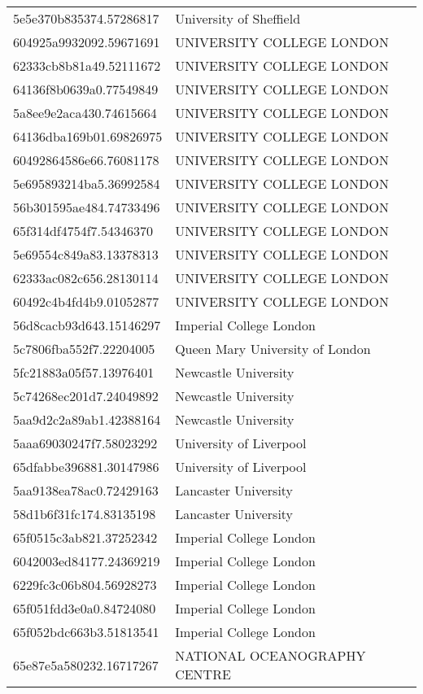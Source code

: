 \begin{tabular}{ll}
5e5e370b835374.57286817 & University of Sheffield \\
604925a9932092.59671691 & UNIVERSITY COLLEGE LONDON \\
62333cb8b81a49.52111672 & UNIVERSITY COLLEGE LONDON \\
64136f8b0639a0.77549849 & UNIVERSITY COLLEGE LONDON \\
5a8ee9e2aca430.74615664 & UNIVERSITY COLLEGE LONDON \\
64136dba169b01.69826975 & UNIVERSITY COLLEGE LONDON \\
60492864586e66.76081178 & UNIVERSITY COLLEGE LONDON \\
5e695893214ba5.36992584 & UNIVERSITY COLLEGE LONDON \\
56b301595ae484.74733496 & UNIVERSITY COLLEGE LONDON \\
65f314df4754f7.54346370 & UNIVERSITY COLLEGE LONDON \\
5e69554c849a83.13378313 & UNIVERSITY COLLEGE LONDON \\
62333ac082c656.28130114 & UNIVERSITY COLLEGE LONDON \\
60492c4b4fd4b9.01052877 & UNIVERSITY COLLEGE LONDON \\
56d8cacb93d643.15146297 & Imperial College London \\
5c7806fba552f7.22204005 & Queen Mary University of London \\
5fc21883a05f57.13976401 & Newcastle University \\
5c74268ec201d7.24049892 & Newcastle University \\
5aa9d2c2a89ab1.42388164 & Newcastle University \\
5aaa69030247f7.58023292 & University of Liverpool \\
65dfabbe396881.30147986 & University of Liverpool \\
5aa9138ea78ac0.72429163 & Lancaster University \\
58d1b6f31fc174.83135198 & Lancaster University \\
65f0515c3ab821.37252342 & Imperial College London \\
6042003ed84177.24369219 & Imperial College London \\
6229fc3c06b804.56928273 & Imperial College London \\
65f051fdd3e0a0.84724080 & Imperial College London \\
65f052bdc663b3.51813541 & Imperial College London \\
65e87e5a580232.16717267 & NATIONAL OCEANOGRAPHY CENTRE \\

\end{tabular}
